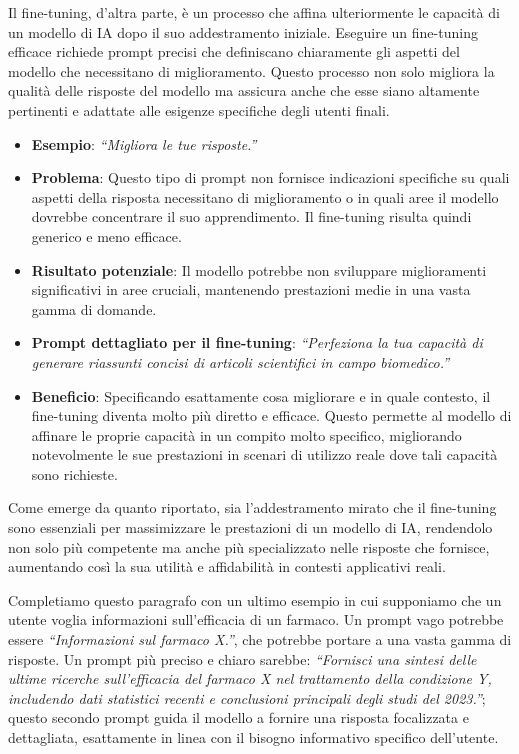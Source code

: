             Il fine-tuning, d'altra parte, è un processo che affina ulteriormente le capacità di un modello di IA dopo il suo addestramento iniziale. Eseguire un fine-tuning efficace richiede prompt precisi che definiscano chiaramente gli aspetti del modello che necessitano di miglioramento. Questo processo non solo migliora la qualità delle risposte del modello ma assicura anche che esse siano altamente pertinenti e adattate alle esigenze specifiche degli utenti finali.
            \begin{itemize}
                \item \textbf{Esempio}: \textit{``Migliora le tue risposte.''}
                
                \item \textbf{Problema}: Questo tipo di prompt non fornisce indicazioni specifiche su quali aspetti della risposta necessitano di miglioramento o in quali aree il modello dovrebbe concentrare il suo apprendimento. Il fine-tuning risulta quindi generico e meno efficace.
                
                \item \textbf{Risultato potenziale}: Il modello potrebbe non sviluppare miglioramenti significativi in aree cruciali, mantenendo prestazioni medie in una vasta gamma di domande.
                
                \item \textbf{Prompt dettagliato per il fine-tuning}: \textit{``Perfeziona la tua capacità di generare riassunti concisi di articoli scientifici in campo biomedico.''}
                
                \item \textbf{Beneficio}: Specificando esattamente cosa migliorare e in quale contesto, il fine-tuning diventa molto più diretto e efficace. Questo permette al modello di affinare le proprie capacità in un compito molto specifico, migliorando notevolmente le sue prestazioni in scenari di utilizzo reale dove tali capacità sono richieste.
            \end{itemize}

            Come emerge da quanto riportato, sia l'addestramento mirato che il fine-tuning sono essenziali per massimizzare le prestazioni di un modello di IA, rendendolo non solo più competente ma anche più specializzato nelle risposte che fornisce, aumentando così la sua utilità e affidabilità in contesti applicativi reali.

            Completiamo questo paragrafo con un ultimo esempio in cui supponiamo che un utente voglia informazioni sull'efficacia di un farmaco. Un prompt vago potrebbe essere \textit{``Informazioni sul farmaco X.''}, che potrebbe portare a una vasta gamma di risposte. Un prompt più preciso e chiaro sarebbe: \textit{``Fornisci una sintesi delle ultime ricerche sull'efficacia del farmaco X nel trattamento della condizione Y, includendo dati statistici recenti e conclusioni principali degli studi del 2023.''}; questo secondo prompt guida il modello a fornire una risposta focalizzata e dettagliata, esattamente in linea con il bisogno informativo specifico dell'utente.
            
